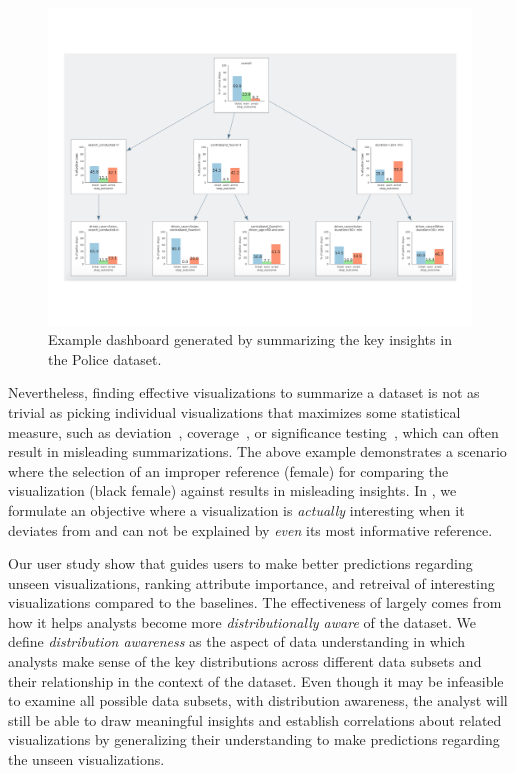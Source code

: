 \begin{figure}[h!]
\label{fig:sbd}
\centering
\includegraphics[width=0.7\linewidth]{figures/storyboard.pdf}
\caption{Example dashboard generated by \sbd summarizing the key insights in the Police dataset.}
\end{figure} 

Nevertheless, finding effective visualizations to summarize a dataset is not as trivial as picking individual visualizations that maximizes some statistical measure, such as deviation~\cite{Vartak2015}, coverage~\cite{Sarvghad2017}, or significance testing~\cite{Anand2015}, which can often result in misleading summarizations. The above example demonstrates a scenario where the selection of an improper reference (female) for comparing the visualization (black female) against results in misleading insights. In \sbd, we formulate an objective where a visualization is \emph{actually} interesting when it deviates from and can not be explained by \emph{even} its most informative reference.




\par Our user study show that \sbd guides users to make better predictions regarding unseen visualizations, ranking attribute importance, and retreival of interesting visualizations compared to the baselines. The effectiveness of \sbd largely comes from how it helps analysts become more \emph{distributionally aware} of the dataset. We define \emph{distribution awareness} as the aspect of data understanding in which analysts make sense of the key distributions across different data subsets and their relationship in the context of the dataset. Even though it may be infeasible to examine all possible data subsets, with distribution awareness, the analyst will still be able to draw meaningful insights and establish correlations about related visualizations by generalizing their understanding to make predictions regarding the unseen visualizations. 

